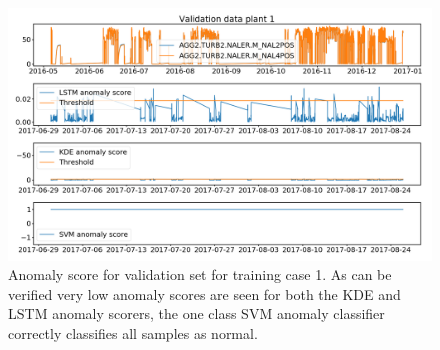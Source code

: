     \begin{figure}
        \centering
        \includegraphics[width=\textwidth]{report/figures/analysis/plant1_training/test_data_anomaly.png}
        \caption{Anomaly score for validation set for training case 1. As can be verified very low anomaly scores are seen for both the KDE and LSTM anomaly scorers, the one class SVM anomaly classifier correctly classifies all samples as normal.}
        \label{fig:anomaly_training_plant1}
    \end{figure}

    
    
    
    
    
